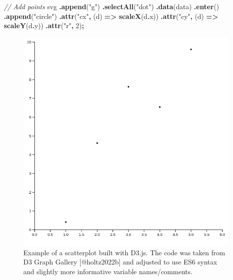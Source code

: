 \documentclass[
]{book}
\newenvironment{Shaded}{\begin{snugshade}}{\end{snugshade}}
\newcommand{\AttributeTok}[1]{\textcolor[rgb]{0.13,0.29,0.53}{#1}}
\newcommand{\CommentTok}[1]{\textcolor[rgb]{0.56,0.35,0.01}{\textit{#1}}}
\newcommand{\DecValTok}[1]{\textcolor[rgb]{0.00,0.00,0.81}{#1}}
\newcommand{\FunctionTok}[1]{\textcolor[rgb]{0.13,0.29,0.53}{\textbf{#1}}}
\newcommand{\KeywordTok}[1]{\textcolor[rgb]{0.13,0.29,0.53}{\textbf{#1}}}
\newcommand{\NormalTok}[1]{#1}
\newcommand{\OperatorTok}[1]{\textcolor[rgb]{0.81,0.36,0.00}{\textbf{#1}}}
\newcommand{\StringTok}[1]{\textcolor[rgb]{0.31,0.60,0.02}{#1}}
\theoremstyle{definition}
\theoremstyle{definition}
\theoremstyle{definition}
\theoremstyle{definition}
\theoremstyle{remark}
\begin{document}
\begin{Shaded}
\begin{Highlighting}[]
\CommentTok{// Add points}
\NormalTok{svg}
  \OperatorTok{.}\FunctionTok{append}\NormalTok{(}\StringTok{"g"}\NormalTok{)}
  \OperatorTok{.}\FunctionTok{selectAll}\NormalTok{(}\StringTok{"dot"}\NormalTok{)}
  \OperatorTok{.}\FunctionTok{data}\NormalTok{(data)}
  \OperatorTok{.}\FunctionTok{enter}\NormalTok{()}
  \OperatorTok{.}\FunctionTok{append}\NormalTok{(}\StringTok{"circle"}\NormalTok{)}
  \OperatorTok{.}\FunctionTok{attr}\NormalTok{(}\StringTok{"cx"}\OperatorTok{,}\NormalTok{ (d) }\KeywordTok{=\textgreater{}} \FunctionTok{scaleX}\NormalTok{(d}\OperatorTok{.}\AttributeTok{x}\NormalTok{))}
  \OperatorTok{.}\FunctionTok{attr}\NormalTok{(}\StringTok{"cy"}\OperatorTok{,}\NormalTok{ (d) }\KeywordTok{=\textgreater{}} \FunctionTok{scaleY}\NormalTok{(d}\OperatorTok{.}\AttributeTok{y}\NormalTok{))}
  \OperatorTok{.}\FunctionTok{attr}\NormalTok{(}\StringTok{"r"}\OperatorTok{,} \DecValTok{2}\NormalTok{)}\OperatorTok{;}
\end{Highlighting}
\end{Shaded}

\begin{figure}

{\centering \includegraphics[width=1\linewidth,height=1\textheight]{./figures/d3-scatterplot} 

}

\caption{Example of a scatterplot built with D3.js. The code was taken from D3 Graph Gallery [@holtz2022b] and adjusted to use ES6 syntax and slightly more informative variable names/comments.}\label{fig:d3-scatterplot}
\end{figure}
\end{document}

